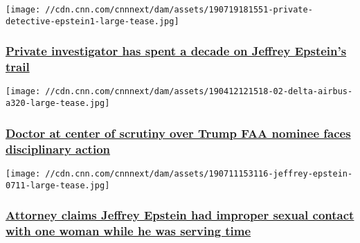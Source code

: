 \href{/2019/07/19/us/private-investigator-fisten-epstein-sex-case-invs/index.html}{}

\texttt{[image: //cdn.cnn.com/cnnnext/dam/assets/190719181551-private-detective-epstein1-large-tease.jpg]}

\hypertarget{private-investigator-has-spent-a-decade-on-jeffrey-epsteins-trail}{%
\subsubsection{\texorpdfstring{\href{/2019/07/19/us/private-investigator-fisten-epstein-sex-case-invs/index.html}{Private
investigator has spent a decade on Jeffrey Epstein's
trail}}{Private investigator has spent a decade on Jeffrey Epstein's trail}}\label{private-investigator-has-spent-a-decade-on-jeffrey-epsteins-trail}}

\href{/2019/07/12/politics/psychiatrist-pilots-faa-nominee/index.html}{}

\texttt{[image: //cdn.cnn.com/cnnnext/dam/assets/190412121518-02-delta-airbus-a320-large-tease.jpg]}

\hypertarget{doctor-at-center-of-scrutiny-over-trump-faa-nominee-faces-disciplinary-action}{%
\subsubsection{\texorpdfstring{\href{/2019/07/12/politics/psychiatrist-pilots-faa-nominee/index.html}{Doctor
at center of scrutiny over Trump FAA nominee faces disciplinary
action}}{Doctor at center of scrutiny over Trump FAA nominee faces disciplinary action}}\label{doctor-at-center-of-scrutiny-over-trump-faa-nominee-faces-disciplinary-action}}

\href{/2019/07/16/us/jeffrey-epstein-sexual-assault/index.html}{}

\texttt{[image: //cdn.cnn.com/cnnnext/dam/assets/190711153116-jeffrey-epstein-0711-large-tease.jpg]}

\hypertarget{attorney-claims-jeffrey-epstein-had-improper-sexual-contact-with-one-woman-while-he-was-serving-time-}{%
\subsubsection{\texorpdfstring{\href{/2019/07/16/us/jeffrey-epstein-sexual-assault/index.html}{Attorney
claims Jeffrey Epstein had improper sexual contact with one woman while
he was serving time
}}{Attorney claims Jeffrey Epstein had improper sexual contact with one woman while he was serving time }}\label{attorney-claims-jeffrey-epstein-had-improper-sexual-contact-with-one-woman-while-he-was-serving-time-}}

